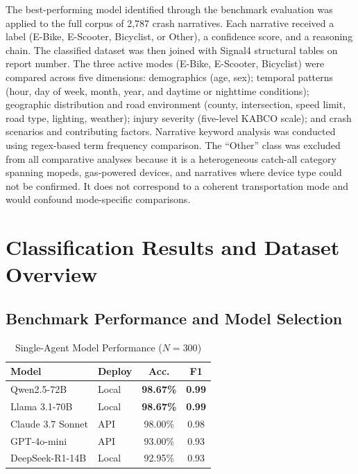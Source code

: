 \documentclass[numbered]{trbunofficial}
\begin{document}
The best-performing model identified through the benchmark evaluation was applied to the full corpus of 2,787 crash narratives. Each narrative received a label (E-Bike, E-Scooter, Bicyclist, or Other), a confidence score, and a reasoning chain. The classified dataset was then joined with Signal4 structural tables on report number. The three active modes (E-Bike, E-Scooter, Bicyclist) were compared across five dimensions: demographics (age, sex); temporal patterns (hour, day of week, month, year, and daytime or nighttime conditions); geographic distribution and road environment (county, intersection, speed limit, road type, lighting, weather); injury severity (five-level KABCO scale); and crash scenarios and contributing factors. Narrative keyword analysis was conducted using regex-based term frequency comparison. The ``Other'' class was excluded from all comparative analyses because it is a heterogeneous catch-all category spanning mopeds, gas-powered devices, and narratives where device type could not be confirmed. It does not correspond to a coherent transportation mode and would confound mode-specific comparisons.

\section{Classification Results and Dataset Overview}
\label{sec:results}

\subsection{Benchmark Performance and Model Selection}
\label{sec:results_llm}


\begin{table}[H]
\centering
\caption{Single-Agent Model Performance ($N = 300$)}
\label{tab:single_agent}
\begin{tabular}{llcc}
\toprule
\textbf{Model} & \textbf{Deploy} & \textbf{Acc.} & \textbf{F1} \\
\midrule
Qwen2.5-72B       & Local  & \textbf{98.67\%} & \textbf{0.99} \\
Llama 3.1-70B     & Local  & \textbf{98.67\%} & \textbf{0.99} \\
Claude 3.7 Sonnet & API    & 98.00\%          & 0.98 \\
GPT-4o-mini       & API    & 93.00\%          & 0.93 \\
DeepSeek-R1-14B   & Local  & 92.95\%          & 0.93 \\
\bottomrule
\end{tabular}
\end{table}
\end{document}
